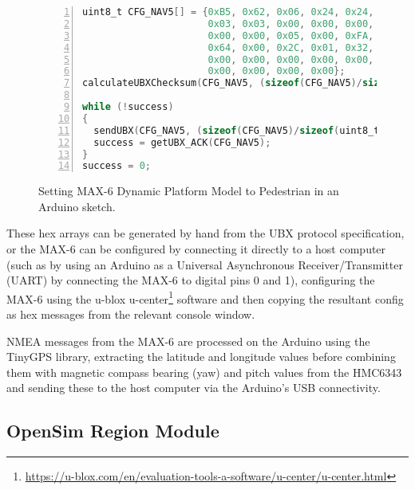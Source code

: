 \begin{figure}[h]
\begin{lstlisting}[language=C, numbers=left, numberstyle=\small, stepnumber=1, frame=single, breaklines=true, backgroundcolor=\color{codebackground}, showstringspaces=false]
uint8_t CFG_NAV5[] = {0xB5, 0x62, 0x06, 0x24, 0x24, 0x00, 0xFF, 0xFF,
                      0x03, 0x03, 0x00, 0x00, 0x00, 0x00, 0x10, 0x27,
                      0x00, 0x00, 0x05, 0x00, 0xFA, 0x00, 0xFA, 0x00,
                      0x64, 0x00, 0x2C, 0x01, 0x32, 0x3C, 0x00, 0x00,
                      0x00, 0x00, 0x00, 0x00, 0x00, 0x00, 0x00, 0x00,
                      0x00, 0x00, 0x00, 0x00};
calculateUBXChecksum(CFG_NAV5, (sizeof(CFG_NAV5)/sizeof(uint8_t)));

while (!success)
{
  sendUBX(CFG_NAV5, (sizeof(CFG_NAV5)/sizeof(uint8_t)));
  success = getUBX_ACK(CFG_NAV5);
}
success = 0;
\end{lstlisting}
\caption{Setting MAX-6 Dynamic Platform Model to Pedestrian in an Arduino sketch.}
\label{arduinoMAX6hex}
\end{figure}

These hex arrays can be generated by hand from the UBX protocol specification\maxProtocolFootnote{}, or the MAX-6 can be configured by connecting it directly to a host computer (such as by using an Arduino as a Universal Asynchronous Receiver/Transmitter (UART) by connecting the MAX-6 to digital pins 0 and 1), configuring the MAX-6 using the u-blox u-center\footnote{\url{https://u-blox.com/en/evaluation-tools-a-software/u-center/u-center.html}} software and then copying the resultant config as hex messages from the relevant console window.

NMEA messages from the MAX-6 are processed on the Arduino using the TinyGPS library\tinygpsFootnote{}, extracting the latitude and longitude values before combining them with magnetic compass bearing (yaw) and pitch values from the HMC6343 and sending these to the host computer via the Arduino's USB connectivity.


\subsection{OpenSim Region Module}

\label{regionModule}

\newcommand{\RegionModuleFootnote}{\footnote{\url{http://opensimulator.org/wiki/IRegionModule}}}

